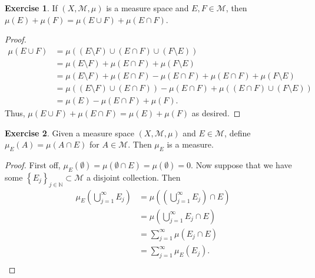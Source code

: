 \documentclass{article}
\theoremstyle{definition}
\newtheorem{ex}{Exercise}
\begin{document}
\begin{ex}
	If $(X, \mathscr{M}, \mu)$ is a measure space and $E, F \in \mathscr{M}$, then $\mu(E) + \mu(F) = \mu(E \cup F) + \mu(E \cap F)$.
\end{ex}
\begin{proof}
	\begin{align*}
		\mu(E \cup F) & = \mu((E \setminus F) \cup (E \cap F) \cup (F \setminus E))                                   \\
		              & = \mu(E \setminus F) + \mu(E \cap F) + \mu(F \setminus E)                                     \\
		              & = \mu(E \setminus F) + \mu(E \cap F) - \mu(E \cap F) + \mu(E \cap F) + \mu(F \setminus E)     \\
		              & = \mu((E \setminus F) \cup (E \cap F)) - \mu(E \cap F) + \mu((E \cap F) \cup (F \setminus E)) \\
		              & = \mu(E) - \mu(E \cap F) + \mu(F).
	\end{align*}
	Thus, $\mu(E \cup F) + \mu(E \cap F) = \mu(E) + \mu(F)$ as desired.
\end{proof}

\begin{ex}
	Given a measure space $(X, \mathscr{M}, \mu)$ and $E \in \mathscr{M}$, define $\mu_E(A) = \mu(A \cap E)$ for $A \in \mathscr{M}$.
	Then $\mu_E$ is a measure.
\end{ex}
\begin{proof}
	First off, $\mu_E(\emptyset) = \mu(\emptyset \cap E) = \mu(\emptyset) = 0$.
	Now suppose that we have some $\left\lbrace E_j \right\rbrace_{j \in \mathbb{N}} \subset \mathscr{M}$ a disjoint collection.
	Then \begin{align*}
		\mu_E \left( \bigcup _{j = 1}^{\infty}E_j \right) & = \mu \left( \left(\bigcup _{j = 1}^{\infty} E_j \right) \cap E \right) \\
		                                                  & = \mu \left( \bigcup _{j = 1}^{\infty} E_j \cap E \right)               \\
		                                                  & = \sum _{j = 1}^{\infty} \mu \left( E_j \cap E \right)                  \\
		                                                  & = \sum _{j = 1}^{\infty} \mu_E \left( E_j \right).                      \\
	\end{align*}
\end{proof}
\end{document}
